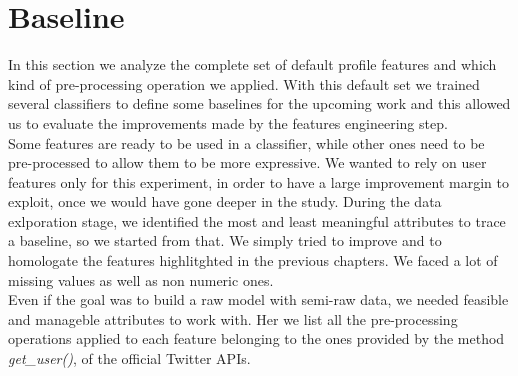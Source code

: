 \section{Baseline}
In this section we analyze the complete set of default profile features and which kind of pre-processing operation we applied. With this default set we trained several classifiers to define some baselines for the upcoming work and this allowed us to evaluate the improvements made by the features engineering step.\\
Some features are ready to be used in a classifier, while other ones need to be pre-processed to allow them to be more expressive.
We wanted to rely on user features only for this experiment, in order to have a large improvement margin to exploit, once we would have gone deeper in the study.
During the data exlporation stage, we identified the most and least meaningful attributes to trace a baseline, so we started from that. We simply tried to improve and to homologate the features highlitghted in the previous chapters.
We faced a lot of missing values as well as non numeric ones.\\
Even if the goal was to build a raw model with semi-raw data, we needed feasible and manageble attributes to work with.
Her we list all the pre-processing operations applied to each feature belonging to the ones provided by the method \textit{get\_user()}, of the official Twitter APIs.

